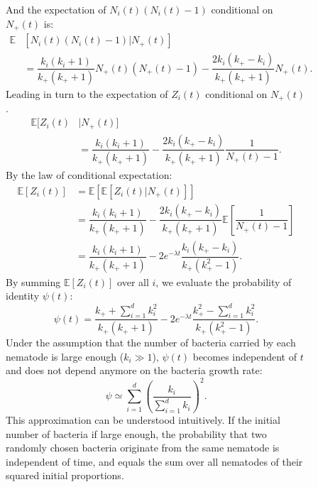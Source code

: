 \documentclass[10pt]{article}
\begin{document}
\begin{multicols}{2}
\begin{figure*}[hbtp!]
\begin{mdframed}
\begin{multicols}{2}
And the expectation of $N_i(t)(N_i(t)-1)$ conditional on $N_+(t)$ is:
\begin{align}
 \mathbb{E} & [ N_i(t) (N_i(t)-1) \vert N_+(t) ]   \nonumber \\
 &=\dfrac{k_i(k_i+1) }{k_+ (k_+ +1)}N_+(t) ( N_+(t) -1 ) -\dfrac{2 k_i (k_+ - k_i) }{k_+ (k_+ +1)} N_+(t) .
\end{align}
Leading in turn to the expectation of $Z_i(t)$ conditional on $N_+(t)$.
\begin{align}
  \mathbb{E} [  Z_i(t)  & \vert N_+(t) ]  \nonumber \\
 &= \dfrac{k_i(k_i+1)}{k_+ (k_+ +1)}- \dfrac{2 k_i (k_+ -k_i)}{k_+ (k_+ +1)} \dfrac{1}{ N_+(t) -1  }.
\end{align}
By the law of conditional expectation:
\begin{align}
\mathbb{E}\left[ Z_i(t) \right] &=
 \mathbb{E}\left[ \mathbb{E}\left[ \left. Z_i(t) \right\vert N_+(t) \right] \right]\\
 &=\dfrac{k_i(k_i+1)}{k_+ (k_+ +1 )}-\dfrac{2 k_i (k_+ -k_i)}{k_+ (k_+ +1 )}\mathbb{E}\left[\dfrac{1}{N_+(t)-1} \right] \\
 & =\dfrac{k_i(k_i+1)}{k_+ (k_+ +1 )}-2e^{-\lambda t}\dfrac{ k_i (k_+ -k_i)}{k_+ (k_+^2 -1 )}.
\end{align}
By summing $\mathbb{E}\left[ Z_i(t) \right]$ over all $i$, we evaluate the probability of identity $\psi(t)$:
\begin{equation}
\psi(t) =\dfrac{ k_+ + \sum_{i=1}^d k_i^2}{k_+ (k_+ +1)}  -2 e^{-\lambda t} \dfrac{ k_+^2-\sum_{i=1}^d k_i^2}{k_+ (k_+^2 -1) }.
\end{equation}
Under the assumption that the number of bacteria carried by each nematode is large enough ($k_i \gg 1$), $\psi(t)$ becomes independent of $t$ and does not depend anymore on
 the bacteria growth rate:
 \begin{equation}
\psi \simeq \displaystyle \sum_{i=1}^d \left( \dfrac{ k_i}{\sum_{i=1}^d k_i} \right)^2.
 \end{equation}
 This approximation can be understood intuitively.
 If the initial number of bacteria if large enough, the probability that two randomly chosen bacteria originate from the same nematode is independent of time, and equals the sum over all nematodes of their squared initial proportions.
 \end{multicols}
 \end{mdframed}
\end{figure*}
 \begin{figure*}[hbt!]
\centering

\end{figure*}
\end{multicols}
\end{document}
